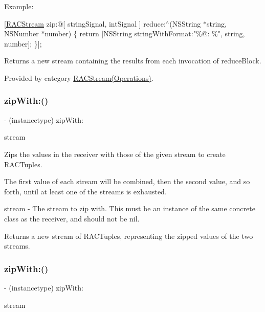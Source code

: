 Example\+:

\mbox{[}\mbox{\hyperlink{interface_r_a_c_stream}{R\+A\+C\+Stream}} zip\+:@\mbox{[} string\+Signal, int\+Signal \mbox{]} reduce\+:$^\wedge$(N\+S\+String $\ast$string, N\+S\+Number $\ast$number) \{ return \mbox{[}N\+S\+String string\+With\+Format\+:"\%@\+: \%", string, number\mbox{]}; \}\mbox{]};

Returns a new stream containing the results from each invocation of {\ttfamily reduce\+Block}. 

Provided by category \mbox{\hyperlink{category_r_a_c_stream_07_operations_08_aba7b1d8c9ac130afad52b0baca8ae016}{R\+A\+C\+Stream(\+Operations)}}.

\mbox{\label{interface_r_a_c_stream_a6d06fc682aaa557fbe33af0658988618}} 
\subsubsection{\texorpdfstring{zip\+With\+:()}{zipWith:()}\hspace{0.1cm}{\footnotesize\ttfamily [1/3]}}
{\footnotesize\ttfamily -\/ (instancetype) zip\+With\+: \begin{DoxyParamCaption}\item[{(\mbox{\hyperlink{interface_r_a_c_stream}{R\+A\+C\+Stream}} $\ast$)}]{stream }\end{DoxyParamCaption}}

Zips the values in the receiver with those of the given stream to create R\+A\+C\+Tuples.

The first value of each stream will be combined, then the second value, and so forth, until at least one of the streams is exhausted.

stream -\/ The stream to zip with. This must be an instance of the same concrete class as the receiver, and should not be {\ttfamily nil}.

Returns a new stream of R\+A\+C\+Tuples, representing the zipped values of the two streams. \mbox{\label{interface_r_a_c_stream_a6d06fc682aaa557fbe33af0658988618}} 
\subsubsection{\texorpdfstring{zip\+With\+:()}{zipWith:()}\hspace{0.1cm}{\footnotesize\ttfamily [2/3]}}
{\footnotesize\ttfamily -\/ (instancetype) zip\+With\+: \begin{DoxyParamCaption}\item[{(\mbox{\hyperlink{interface_r_a_c_stream}{R\+A\+C\+Stream}} $\ast$)}]{stream }\end{DoxyParamCaption}}

